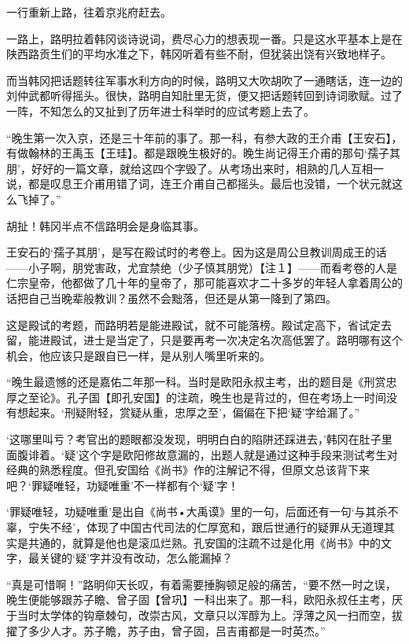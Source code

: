 一行重新上路，往着京兆府赶去。

一路上，路明拉着韩冈谈诗说词，费尽心力的想表现一番。只是这水平基本上是在陕西路贡生们的平均水准之下，韩冈听着有些不耐，但犹装出饶有兴致地样子。

而当韩冈把话题转往军事水利方向的时候，路明又大吹胡吹了一通瞎话，连一边的刘仲武都听得摇头。很快，路明自知肚里无货，便又把话题转回到诗词歌赋。过了一阵，不知怎么的又扯到了历年进士科举时的应试考题上去了。

“晚生第一次入京，还是三十年前的事了。那一科，有参大政的王介甫【王安石】，有做翰林的王禹玉【王珪】。都是跟晚生极好的。晚生尚记得王介甫的那句‘孺子其朋’，好好的一篇文章，就给这四个字毁了。从考场出来时，相熟的几人互相一说，都是叹息王介甫用错了词，连王介甫自己都摇头。最后也没错，一个状元就这么飞掉了。”

胡扯！韩冈半点不信路明会是身临其事。

王安石的‘孺子其朋’，是写在殿试时的考卷上。因为这是周公旦教训周成王的话——小子啊，朋党害政，尤宜禁绝（少子慎其朋党）【注１】——而看考卷的人是仁宗皇帝，他都做了几十年的皇帝了，那可能喜欢才二十多岁的年轻人拿着周公的话把自己当晚辈般教训？虽然不会黜落，但还是从第一降到了第四。

这是殿试的考题，而路明若是能进殿试，就不可能落榜。殿试定高下，省试定去留，能进殿试，进士是当定了，只是要再考一次决定名次高低罢了。路明哪有这个机会，他应该只是跟自已一样，是从别人嘴里听来的。

“晚生最遗憾的还是嘉佑二年那一科。当时是欧阳永叔主考，出的题目是《刑赏忠厚之至论》。孔子国【即孔安国】的注疏，晚生也是背过的，但在考场上一时间没有想起来。‘刑疑附轻，赏疑从重，忠厚之至’，偏偏在下把‘疑’字给漏了。”

‘这哪里叫亏？考官出的题眼都没发现，明明白白的陷阱还踩进去，’韩冈在肚子里面腹诽着。‘疑’这个字是欧阳修故意漏的，出题人就是通过这种手段来测试考生对经典的熟悉程度。但孔安国给《尚书》作的注解记不得，但原文总该背下来吧？‘罪疑唯轻，功疑唯重’不一样都有个‘疑’字！

‘罪疑唯轻，功疑唯重’是出自《尚书•大禹谟》里的一句，后面还有一句‘与其杀不辜，宁失不经’，体现了中国古代司法的仁厚宽和，跟后世通行的疑罪从无道理其实是共通的，就算是他也是滚瓜烂熟。孔安国的注疏不过是化用《尚书》中的文字，最关键的‘疑’字并没有改动，怎么能漏掉？

“真是可惜啊！”路明仰天长叹，有着需要捶胸顿足般的痛苦，“要不然一时之误，晚生便能够跟苏子瞻、曾子固【曾巩】一科出来了。那一科，欧阳永叔任主考，厌于当时太学体的钩章棘句，改崇古风，文章只以浑醇为上。浮薄之风一扫而空，拔擢了多少人才。苏子瞻，苏子由，曾子固，吕吉甫都是一时英杰。”

